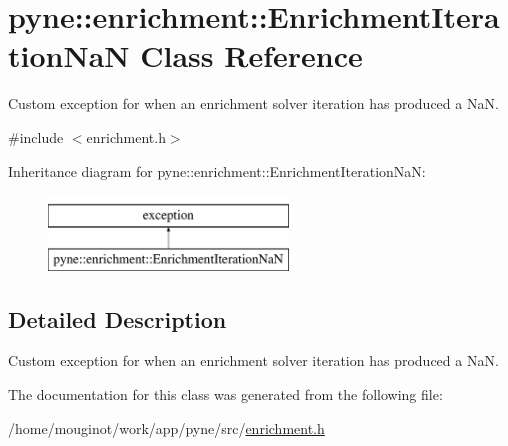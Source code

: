 \hypertarget{classpyne_1_1enrichment_1_1_enrichment_iteration_na_n}{}\section{pyne\+:\+:enrichment\+:\+:Enrichment\+Iteration\+NaN Class Reference}
\label{classpyne_1_1enrichment_1_1_enrichment_iteration_na_n}


Custom exception for when an enrichment solver iteration has produced a NaN.  




{\ttfamily \#include $<$enrichment.\+h$>$}

Inheritance diagram for pyne\+:\+:enrichment\+:\+:Enrichment\+Iteration\+NaN\+:\begin{figure}[H]
\begin{center}
\leavevmode
\includegraphics[height=2.000000cm]{classpyne_1_1enrichment_1_1_enrichment_iteration_na_n}
\end{center}
\end{figure}


\subsection{Detailed Description}
Custom exception for when an enrichment solver iteration has produced a NaN. 

The documentation for this class was generated from the following file\+:\begin{DoxyCompactItemize}
\item 
/home/mouginot/work/app/pyne/src/\hyperlink{enrichment_8h}{enrichment.\+h}\end{DoxyCompactItemize}
